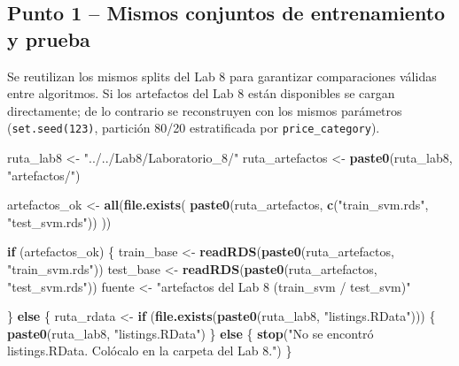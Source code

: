 \documentclass[
]{article}
\newenvironment{Shaded}{\begin{snugshade}}{\end{snugshade}}
\newcommand{\ControlFlowTok}[1]{\textcolor[rgb]{0.13,0.29,0.53}{\textbf{#1}}}
\newcommand{\FunctionTok}[1]{\textcolor[rgb]{0.13,0.29,0.53}{\textbf{#1}}}
\newcommand{\NormalTok}[1]{#1}
\newcommand{\OtherTok}[1]{\textcolor[rgb]{0.56,0.35,0.01}{#1}}
\newcommand{\StringTok}[1]{\textcolor[rgb]{0.31,0.60,0.02}{#1}}
\begin{document}
\hypertarget{punto-1-mismos-conjuntos-de-entrenamiento-y-prueba}{%
\subsection{Punto 1 -- Mismos conjuntos de entrenamiento y
prueba}\label{punto-1-mismos-conjuntos-de-entrenamiento-y-prueba}}

Se reutilizan los mismos splits del Lab 8 para garantizar comparaciones
válidas entre algoritmos. Si los artefactos del Lab 8 están disponibles
se cargan directamente; de lo contrario se reconstruyen con los mismos
parámetros (\texttt{set.seed(123)}, partición 80/20 estratificada por
\texttt{price\_category}).

\begin{Shaded}
\begin{Highlighting}[]
\NormalTok{ruta\_lab8       }\OtherTok{\textless{}{-}} \StringTok{"../../Lab8/Laboratorio\_8/"}
\NormalTok{ruta\_artefactos }\OtherTok{\textless{}{-}} \FunctionTok{paste0}\NormalTok{(ruta\_lab8, }\StringTok{"artefactos/"}\NormalTok{)}

\NormalTok{artefactos\_ok }\OtherTok{\textless{}{-}} \FunctionTok{all}\NormalTok{(}\FunctionTok{file.exists}\NormalTok{(}
  \FunctionTok{paste0}\NormalTok{(ruta\_artefactos, }\FunctionTok{c}\NormalTok{(}\StringTok{"train\_svm.rds"}\NormalTok{, }\StringTok{"test\_svm.rds"}\NormalTok{))}
\NormalTok{))}

\ControlFlowTok{if}\NormalTok{ (artefactos\_ok) \{}
\NormalTok{  train\_base }\OtherTok{\textless{}{-}} \FunctionTok{readRDS}\NormalTok{(}\FunctionTok{paste0}\NormalTok{(ruta\_artefactos, }\StringTok{"train\_svm.rds"}\NormalTok{))}
\NormalTok{  test\_base  }\OtherTok{\textless{}{-}} \FunctionTok{readRDS}\NormalTok{(}\FunctionTok{paste0}\NormalTok{(ruta\_artefactos, }\StringTok{"test\_svm.rds"}\NormalTok{))}
\NormalTok{  fuente }\OtherTok{\textless{}{-}} \StringTok{"artefactos del Lab 8 (train\_svm / test\_svm)"}

\NormalTok{\} }\ControlFlowTok{else}\NormalTok{ \{}
\NormalTok{  ruta\_rdata }\OtherTok{\textless{}{-}} \ControlFlowTok{if}\NormalTok{ (}\FunctionTok{file.exists}\NormalTok{(}\FunctionTok{paste0}\NormalTok{(ruta\_lab8, }\StringTok{"listings.RData"}\NormalTok{))) \{}
    \FunctionTok{paste0}\NormalTok{(ruta\_lab8, }\StringTok{"listings.RData"}\NormalTok{)}
\NormalTok{  \} }\ControlFlowTok{else}\NormalTok{ \{}
    \FunctionTok{stop}\NormalTok{(}\StringTok{"No se encontró listings.RData. Colócalo en la carpeta del Lab 8."}\NormalTok{)}
\NormalTok{  \}}


\end{Highlighting}
\end{Shaded}
\end{document}
